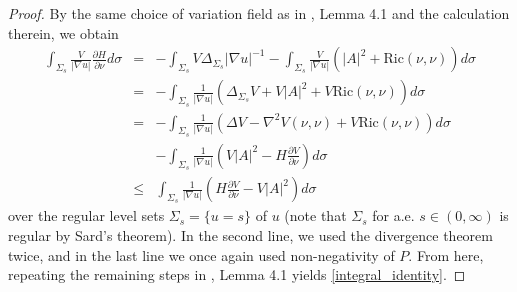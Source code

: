 \documentclass[12pt]{amsart}
\theoremstyle{definition}
\numberwithin{equation}{section}
\begin{document}
\begin{proof}
By the same choice of variation field as in \cite{W18}, Lemma 4.1 and the calculation therein, we obtain
\begin{eqnarray}
   \int_{\Sigma_{s}} \frac{V}{|\nabla u|} \frac{\partial H}{\partial \nu} d\sigma &=& -\int_{\Sigma_{s}} V \Delta_{\Sigma_{s}} |\nabla u|^{-1} - \int_{\Sigma_{s}} \frac{V}{|\nabla u|} \left( |A|^{2} + \text{Ric}(\nu,\nu) \right) d\sigma \\
   &=& -\int_{\Sigma_{s}} \frac{1}{|\nabla u|} \left( \Delta_{\Sigma_{s}} V + V|A|^{2} + V \text{Ric}(\nu,\nu) \right) d\sigma \nonumber \\
   &=& -\int_{\Sigma_{s}} \frac{1}{|\nabla u|} \left( \Delta V - \nabla^{2} V(\nu,\nu) + V \text{Ric}(\nu,\nu) \right) d\sigma \nonumber \\ 
   & & - \int_{\Sigma_{s}} \frac{1}{|\nabla u|} \left( V|A|^{2} - H \frac{\partial V}{\partial \nu} \right) d\sigma \nonumber \\
   &\leq& \int_{\Sigma_{s}} \frac{1}{|\nabla u|} \left( H\frac{\partial V}{\partial \nu} - V|A|^{2} \right) d\sigma \nonumber
\end{eqnarray} 
over the regular level sets $\Sigma_{s}= \{ u = s \}$ of $u$ (note that $\Sigma_{s}$ for a.e. $s \in (0,\infty)$ is regular by Sard's theorem). In the second line, we used the divergence theorem twice, and in the last line we once again used non-negativity of $P$. From here, repeating the remaining steps in \cite{W18}, Lemma 4.1 yields \eqref{integral_identity}.
\end{proof}
\end{document}

